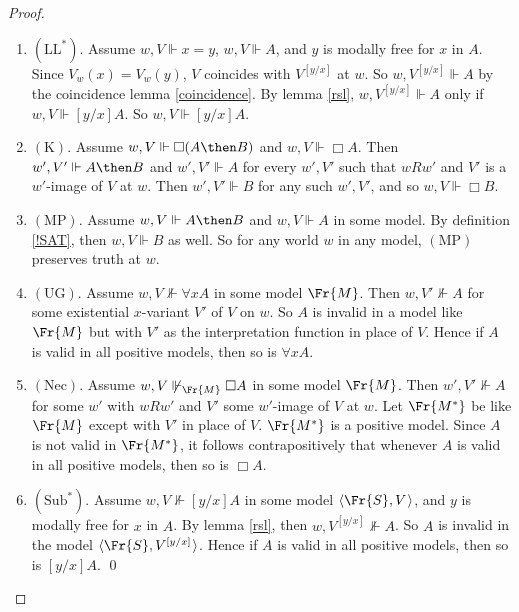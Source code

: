 \documentclass[11pt]{woarticle}
\theoremstyle{break}
\theoremstyle{nonumberplain}
\newcommand{\SAT}{\Vdash}
\newcommand{\1}{\;\,|\;\,}
\renewcommand{\t}[1]{\ensuremath{\langle #1  \makebox[.2ex]{}\rangle}}
\newcommand{\T}[1]{\ensuremath{(\mathrm{ #1})}}
\begin{document}
\begin{proof}
\begin{enumerate}
    \item \T{LL^*}.\; Assume $w,V \SAT x\!=\!y$, $w,V \SAT A$, and $y$ is
          modally free for $x$ in $A$. Since $V_w(x) = V_w(y)$, $V$ coincides
          with $V^{[y/x]}$ at $w$. So $w,V^{[y/x]} \SAT A$ by the coincidence
          lemma \ref{coincidence}. By lemma \ref{rsl}, $w,V^{[y/x]} \SAT A$ only
          if $w,V \SAT [y/x]A$. So $w,V \SAT [y/x]A$.

    \item \T{K}.\; Assume $w,V \SAT \Box (A\then B)$ and $w,V \SAT \Box A$. Then
          $w',V' \SAT A \then B$ and $w',V' \SAT A$ for every $w',V'$ such that
          $wRw'$ and $V'$ is a $w'$-image of $V$ at $w$. Then $w',V'\SAT B$ for
          any such $w',V'$, and so $w,V\SAT \Box B$.

    \item \T{MP}.\; Assume $w,V \SAT A\then B$ and $w,V \SAT A$ in some model.
          By definition \ref{!SAT}, then $w,V \SAT B$ as well. So for any world
          $w$ in any model, \T{MP} preserves truth at $w$.

    \item \T{UG}.\; Assume $w,V \not\SAT \forall x A$ in some model $\Fr{M}$.
          Then $w, V' \not\SAT A$ for some existential $x$-variant $V'$ of $V$
          on $w$. So $A$ is invalid in a model like $\Fr{M}$ but with $V'$ as
          the interpretation function in place of $V$. Hence if $A$ is valid in
          all positive models, then so is $\forall x A$.

    \item \T{Nec}.\; Assume $w,V \not\SAT_{\Fr{M}} \Box A$ in some model
          $\Fr{M}$. Then $w',V' \not\SAT A$ for some $w'$ with $wRw'$ and $V'$
          some $w'$-image of $V$ at $w$. Let $\Fr{M^*}$ be like $\Fr{M}$ except
          with $V'$ in place of $V$. $\Fr{M^*}$ is a positive model. Since $A$
          is not valid in $\Fr{M^*}$, it follows contrapositively that whenever
          $A$ is valid in all positive models, then so is $\Box A$.

    \item \T{Sub^*}.\; Assume $w,V \not\SAT [y/x] A$ in some model
          $\t{\Fr{S},V}$, and $y$ is modally free for $x$ in $A$. By lemma
          \ref{rsl}, then $w, V^{[y/x]} \not\SAT A$. So $A$ is invalid in the
          model $\t{\Fr{S}, V^{[y/x]}}$. Hence if $A$ is valid in all positive
          models, then so is $[y/x]A$. \qed

  \end{enumerate}

\end{proof}
\end{document}
